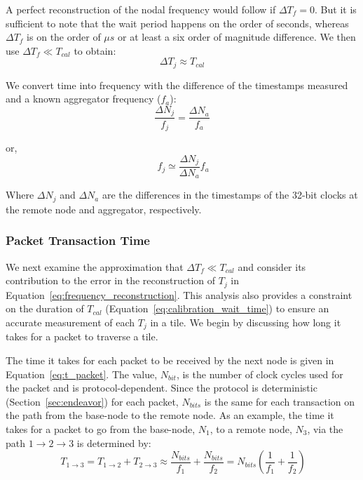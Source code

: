 A perfect reconstruction of the nodal frequency would follow if $\Delta T_{f} = 0$.
But it is sufficient to note that the wait period happens on the order of seconds, whereas $\Delta T_{f}$ is on the order of $\mu s$ or at least a six order of magnitude difference.
We then use $\Delta T_{f} \ll T_{cal}$ to obtain:
\begin{equation}
  \Delta T_{j} \approx T_{cal}
\end{equation}

We convert time into frequency with the difference of the timestamps measured and a known aggregator frequency ($f_{a}$):
\begin{equation}
   \frac{\Delta N_{j}}{f_{j}} = \frac{\Delta N_{a}}{f_{a}}
\end{equation}

or,
\begin{equation}~\label{eq:frequency_reconstruction}
   \boxed{f_{j} \simeq \frac{\Delta N_{j}}{\Delta N_{a}}f_{a}}
\end{equation}

Where $\Delta N_{j}$ and $\Delta N_{a}$ are the differences in the timestamps of the 32-bit clocks at the remote node and aggregator, respectively.


\subsubsection{Packet Transaction Time}

We next examine the approximation that $\Delta T_{f} \ll T_{cal}$ and consider its contribution to the error in the reconstruction of $T_{j}$ in Equation~\ref{eq:frequency_reconstruction}.
This analysis also provides a constraint on the duration of $T_{cal}$ (Equation~\ref{eq:calibration_wait_time}) to ensure an accurate measurement of each $T_{j}$ in a tile.
We begin by discussing how long it takes for a packet to traverse a tile.

The time it takes for each packet to be received by the next node is given in Equation~\ref{eq:t_packet}.
The value, $N_{bit}$, is the number of clock cycles used for the packet and is protocol-dependent.
Since the protocol is deterministic (Section~\ref{sec:endeavor}) for each packet, $N_{bits}$ is the same for each transaction on the path from the base-node to the remote node.
As an example, the time it takes for a packet to go from the base-node, $N_{1}$, to a remote node, $N_{3}$, via the path $1\rightarrow 2 \rightarrow 3$ is determined by:
\begin{equation}~\label{eq:t_packetTransfer}
  T_{1\rightarrow 3} = T_{1\rightarrow 2} + T_{2\rightarrow 3} \approx \frac{N_{bits}}{f_{1}} + \frac{N_{bits}}{f_{2}} = N_{bits}(\frac{1}{f_{1}} + \frac{1}{f_{2}})
\end{equation}

